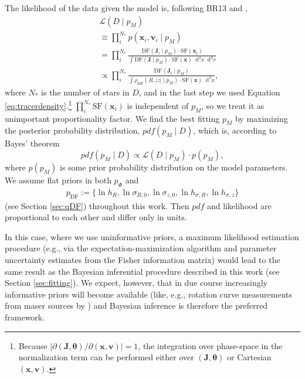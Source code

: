 \documentclass[iop,revtex4,numberedappendix,appendixfloats]{emulateapj}
\newcommand{\vect}[1]{\boldsymbol{#1}}
\newcommand*\Diff[1]{\mathop{}\!\mathrm{d^#1}}
\newcommand{\pdf}{\ensuremath{pdf}}
\newcommand{\pmodel}{\ensuremath{p_M}}
\begin{document}
The likelihood of the data given the model is, following BR13 and \citet{2013MNRAS.433.1411M},
\begin{eqnarray}
&&\mathscr{L}(D \mid \pmodel) \nonumber\\
&&\equiv \prod_i^{N_*} p(\vect{x}_i,\vect{v}_i \mid \pmodel) \nonumber\\
&&= \prod_i^{N_*} \frac{\text{DF}(\vect{J}_i \mid \pmodel) \cdot \text{SF}(\vect{x}_i)}{\int \text{DF}(\vect{J} \mid \pmodel) \cdot \text{SF}(\vect{x}) \Diff 3 x \Diff 3 v}\nonumber\\
&&\propto \prod_i^{N_*} \frac{\text{DF}(\vect{J}_i \mid \pmodel)}{\int \rho_\text{DF}(R,|z| \mid \pmodel) \cdot \text{SF}(\vect{x}) \Diff 3 x}, \label{eq:prob}
\end{eqnarray}
where $N_*$ is the number of stars in $D$, and in the last step we used Equation \eqref{eq:tracerdensity}.\footnote{Because $\left| \partial(\vect{J},\vect{\theta}) / \partial (\vect{x},\vect{v}) \right| = 1$, the integration over phase-space in the normalization term can be performed either over $(\vect{J},\vect{\theta})$ or Cartesian $(\vect{x},\vect{v})$.} $\prod_i^{N_*}\text{SF}(\vect{x}_i)$ is independent of \pmodel{}, so we treat it as unimportant proportionality factor. We find the best fitting \pmodel{} by maximizing the posterior probability distribution, $\pdf{}(\pmodel \mid D)$, which is, according to Bayes' theorem
\begin{equation*}
\pdf{}(\pmodel \mid D) \propto \mathscr{L}(D\mid \pmodel) \cdot p(\pmodel),
\end{equation*}
where $p(\pmodel)$ is some prior probability distribution on the model parameters. We assume flat priors in both $p_\Phi$ and
\begin{eqnarray}
p_\text{DF} := \{ \ln h_R, \ln \sigma_{R,0}, \ln \sigma_{z,0}, \ln h_{\sigma,R}, \ln h_{\sigma,z} \} \label{eq:p_DF}
\end{eqnarray}
(see Section \ref{sec:qDF}) throughout this work. Then \pdf{} and likelihood are proportional to each other and differ only in units.

In this case, where we use uninformative priors, a maximum likelihood estimation procedure (e.g., via the expectation-maximization algorithm and parameter uncertainty estimates from the Fisher information matrix) would lead to the same result as the Bayesian inferential procedure described in this work (see Section \ref{sec:fitting}). We expect, however, that in due course increasingly informative priors will become available (like, e.g., rotation curve measurements from maser sources by \citealt{2009ApJ...700..137R}) and Bayesian inference is therefore the preferred framework.
\end{document}
